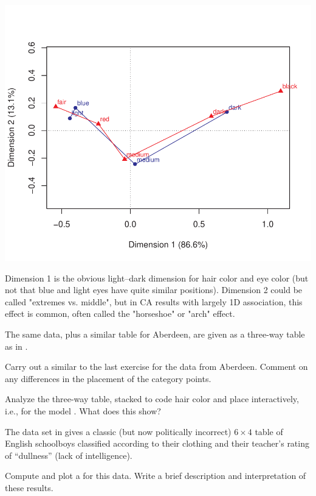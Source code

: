 \documentclass[10pt]{report}\usepackage[]{graphicx}\usepackage[]{color}
\newenvironment{knitrout}{}{} %
\renewenvironment{knitrout}{\small\renewcommand{\baselinestretch}{.85}}{} %
\begin{document}
\begin{Exercises}
\begin{enumerate*}
\begin{ans}
\begin{knitrout}
\centerline{\includegraphics[width=.5\textwidth]{soln/fig/ex6_4b-1} }



\end{knitrout}

Dimension 1 is the obvious light--dark dimension for hair color and eye color (but not that blue and light eyes have quite 
similar positions).  Dimension 2 could be called "extremes vs. middle", but in CA results with largely 1D association,
this effect is common, often called the "horseshoe" or "arch" effect.
    \end{ans}
    
  \end{enumerate*}
  
  \exercise The same data, plus a similar table for Aberdeen, are given as a
  three-way table as  in .
  \begin{enumerate*}
    \item Carry out a similar \ca  to the last exercise 
    for the data from Aberdeen.  
    Comment on any differences in the
    placement of the category points.
    \begin{ans}
    \end{ans}
    
    \item Analyze the three-way table, stacked to code hair color and
    place interactively, i.e., for the \loglin model .
    What does this show?
    \begin{ans}
    \end{ans}
    
  \end{enumerate*}
  
  \exercise\label{lab:ca-gilby} The data set  in  gives a classic (but now politically incorrect)
  $6 \times 4$ table of English
  schoolboys classified according to their clothing and their teacher's rating of ``dullness'' (lack of intelligence).
  \begin{enumerate*}
    \item Compute and plot a \ca for this data.  Write a brief description and interpretation of these results.
    \begin{ans}
    \end{ans}
    

\end{enumerate*}
\end{Exercises}
\end{document}
